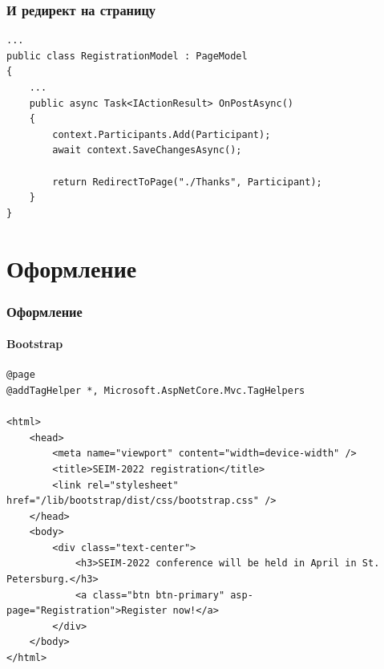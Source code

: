 \documentclass{../../slides-style}
\begin{document}
    \begin{frame}[fragile]
        \frametitle{И редирект на страницу}
        \begin{footnotesize}
            \begin{verbatim}
...
public class RegistrationModel : PageModel
{
    ...
    public async Task<IActionResult> OnPostAsync()
    {
        context.Participants.Add(Participant);
        await context.SaveChangesAsync();

        return RedirectToPage("./Thanks", Participant);
    }
}
            \end{verbatim}
        \end{footnotesize}
    \end{frame}

    \section{Оформление}

    \begin{frame}[fragile]
        \frametitle{Оформление}
        \framesubtitle{Bootstrap}
        \begin{scriptsize}
            \begin{verbatim}
@page
@addTagHelper *, Microsoft.AspNetCore.Mvc.TagHelpers

<html>
    <head>
        <meta name="viewport" content="width=device-width" />
        <title>SEIM-2022 registration</title>
        <link rel="stylesheet" href="/lib/bootstrap/dist/css/bootstrap.css" />
    </head>
    <body>
        <div class="text-center">
            <h3>SEIM-2022 conference will be held in April in St. Petersburg.</h3>
            <a class="btn btn-primary" asp-page="Registration">Register now!</a>
        </div>
    </body>
</html>
            \end{verbatim}
        \end{scriptsize}
    \end{frame}
\end{document}

